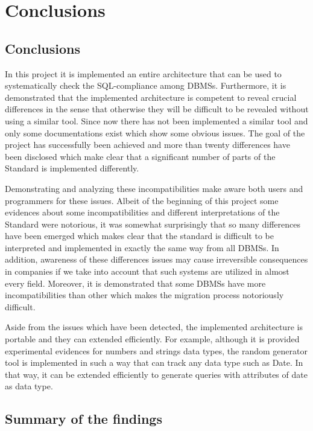 \chapter{Conclusions}

\section{Conclusions}

In this project it is implemented an entire architecture that can be used to systematically check the SQL-compliance among DBMSs. Furthermore, it is demonstrated that the implemented architecture is competent to reveal crucial differences in the sense that otherwise they will be difficult to be revealed without using a similar tool. Since now there has not been implemented a similar tool and only some documentations exist which show some obvious issues. The goal of the project has successfully been achieved and more than twenty differences have been disclosed which make clear that a significant number of parts of the Standard is implemented differently.

Demonstrating and analyzing these incompatibilities make aware both users and programmers for these issues. Albeit of the beginning of this project some evidences about some incompatibilities and different interpretations of the Standard were notorious, it was somewhat surprisingly that so many differences have been emerged which makes clear that the standard is difficult to be interpreted and implemented in exactly the same way from all DBMSs. In addition, awareness of these differences issues may cause irreversible consequences in companies if we take into account that such systems are utilized in almost every field. Moreover, it is demonstrated that some DBMSs have more incompatibilities than other which makes  the migration process notoriously difficult. 

Aside from the issues which have been detected, the implemented architecture is portable and they can extended efficiently. For example, although it is provided experimental evidences for numbers and strings data types, the random generator tool is implemented in such a way that can track any data type such as Date. In that way, it can be extended efficiently to generate queries with attributes of date as data type. 

\section{Summary of the findings}


